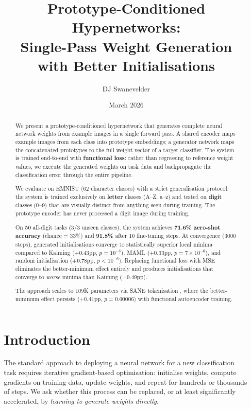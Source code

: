 \documentclass[11pt,a4paper]{article}
\title{\textbf{Prototype-Conditioned Hypernetworks:\\Single-Pass Weight Generation with Better Initialisations}}
\author[1]{DJ Swanevelder}
\affil[1]{Department of Applied Mathematics, Stellenbosch University}
\date{March 2026}
\begin{document}
\maketitle

\begin{abstract}
We present a prototype-conditioned hypernetwork that generates complete neural network weights from example images in a single forward pass. A shared encoder maps example images from each class into prototype embeddings; a generator network maps the concatenated prototypes to the full weight vector of a target classifier. The system is trained end-to-end with \textbf{functional loss}: rather than regressing to reference weight values, we execute the generated weights on task data and backpropagate the classification error through the entire pipeline.

We evaluate on EMNIST (62 character classes) with a strict generalisation protocol: the system is trained exclusively on \textbf{letter} classes (A--Z, a--z) and tested on \textbf{digit} classes (0--9) that are visually distinct from anything seen during training. The prototype encoder has never processed a digit image during training.

On 50 all-digit tasks (3/3 unseen classes), the system achieves \textbf{71.6\% zero-shot accuracy} (chance = 33\%) and \textbf{91.8\%} after 10 fine-tuning steps. At convergence (3000 steps), generated initialisations converge to statistically superior local minima compared to Kaiming ($+0.43$pp, $p = 10^{-6}$), MAML ($+0.33$pp, $p = 7 \times 10^{-6}$), and random initialisation ($+0.78$pp, $p < 10^{-6}$). Replacing functional loss with MSE eliminates the better-minimum effect entirely and produces initialisations that converge to \emph{worse} minima than Kaiming ($-0.49$pp).

The approach scales to 109K parameters via SANE tokenisation \cite{schurholt2024towards}, where the better-minimum effect persists ($+0.41$pp, $p = 0.00006$) with functional autoencoder training.
\end{abstract}

\section{Introduction}
\label{sec:intro}

The standard approach to deploying a neural network for a new classification task requires iterative gradient-based optimisation: initialise weights, compute gradients on training data, update weights, and repeat for hundreds or thousands of steps. We ask whether this process can be replaced, or at least significantly accelerated, by \emph{learning to generate weights directly}.
\end{document}
